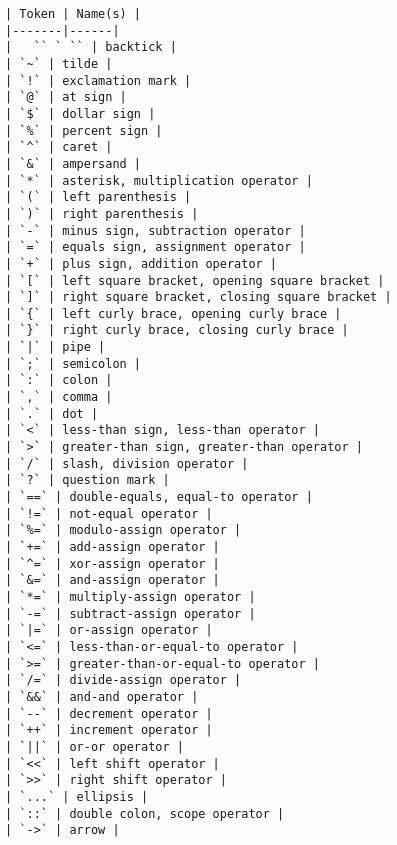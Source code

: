 \begin{verbatim}
| Token | Name(s) |
|-------|------|
|   `` ` `` | backtick |
| `~` | tilde |
| `!` | exclamation mark |
| `@` | at sign |
| `$` | dollar sign |
| `%` | percent sign |
| `^` | caret |
| `&` | ampersand |
| `*` | asterisk, multiplication operator |
| `(` | left parenthesis |
| `)` | right parenthesis |
| `-` | minus sign, subtraction operator |
| `=` | equals sign, assignment operator |
| `+` | plus sign, addition operator |
| `[` | left square bracket, opening square bracket |
| `]` | right square bracket, closing square bracket |
| `{` | left curly brace, opening curly brace |
| `}` | right curly brace, closing curly brace |
| `|` | pipe |
| `;` | semicolon |
| `:` | colon |
| `,` | comma |
| `.` | dot |
| `<` | less-than sign, less-than operator |
| `>` | greater-than sign, greater-than operator |
| `/` | slash, division operator |
| `?` | question mark |
| `==` | double-equals, equal-to operator |
| `!=` | not-equal operator |
| `%=` | modulo-assign operator |
| `+=` | add-assign operator |
| `^=` | xor-assign operator |
| `&=` | and-assign operator |
| `*=` | multiply-assign operator |
| `-=` | subtract-assign operator |
| `|=` | or-assign operator |
| `<=` | less-than-or-equal-to operator |
| `>=` | greater-than-or-equal-to operator |
| `/=` | divide-assign operator |
| `&&` | and-and operator |
| `--` | decrement operator |
| `++` | increment operator |
| `||` | or-or operator |
| `<<` | left shift operator |
| `>>` | right shift operator |
| `...` | ellipsis |
| `::` | double colon, scope operator |
| `->` | arrow |

\end{verbatim}